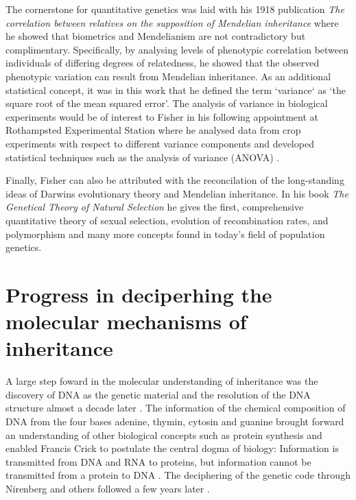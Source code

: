 The cornerstone for quantitative genetics was laid with his 1918 publication \textit{The correlation between relatives on the supposition of Mendelian inheritance} where he showed that biometrics and Mendelianism are not contradictory but complimentary. Specifically, by analysing levels of phenotypic correlation between individuals of differing degrees of relatedness, he showed that the observed phenotypic variation can result from Mendelian inheritance. As an additional statistical concept, it was in this work that he defined the term `variance` as `the square root of the mean squared error'. The analysis of variance in biological experiments would be of interest to Fisher in his following appointment at Rothampsted Experimental Station where he analysed data from crop experiments with respect to different variance components and developed statistical techniques such as the analysis of variance (ANOVA) \citep{Fisher1921,Fisher1923,Eden1929}. 

Finally, Fisher can also be attributed with the reconcilation of the long-standing ideas of Darwins evolutionary theory and Mendelian inheritance. In his book \textit{The Genetical Theory of Natural Selection} he gives the first, comprehensive quantitative theory of sexual selection, evolution of recombination rates, and polymorphism and many more concepts found in today's field of population genetics. 


\section{Progress in deciperhing the molecular mechanisms of inheritance}
A large step foward in the molecular understanding of inheritance was the discovery of DNA as the genetic material \citep{Avery1944} and the resolution of the DNA structure almost a decade later \citep{Watson1953}. The information of the chemical composition of DNA from the four bases adenine, thymin, cytosin and guanine brought forward an understanding of other biological concepts such as protein synthesis and enabled Francis Crick to postulate the central dogma of biology:  Information is transmitted from DNA and RNA to proteins, but information cannot be transmitted from a protein to DNA \citep{Crick1958}. The deciphering of the genetic code through Nirenberg and others followed a few years later \citep{Nirenberg1961,Crick1961,Matthaei1962}.  

